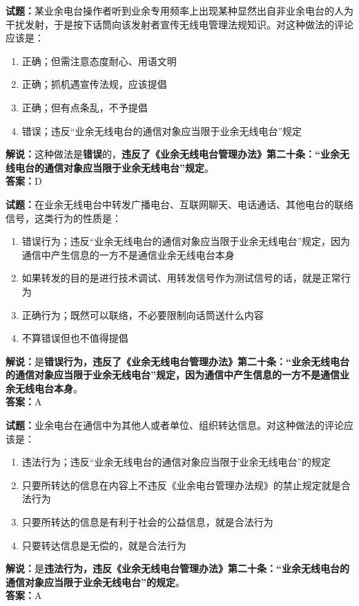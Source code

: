 \documentclass{ctexbook}
\begin{document}
\bigskip


\noindent\textbf{试题：}某业余电台操作者听到业余专用频率上出现某种显然出自非业余电台的人为干扰发射，于是按下话筒向该发射者宣传无线电管理法规知识。对这种做法的评论应该是：
\begin{enumerate}[leftmargin=3em]
\item 正确；但需注意态度耐心、用语文明
\item 正确；抓机遇宣传法规，应该提倡
\item 正确；但有点条乱，不予提倡
\item 错误；违反“业余无线电台的通信对象应当限于业余无线电台”规定%
\end{enumerate}
\noindent\textbf{解说：}这种做法是\textbf{错误}的，\textbf{违反了《业余无线电台管理办法》第二十条：“业余无线电台的通信对象应当限于业余无线电台”规定}。\\\noindent\textbf{答案：}D



\bigskip


\noindent\textbf{试题：}在业余无线电台中转发广播电台、互联网聊天、电话通话、其他电台的联络信号，这类行为的性质是：
\begin{enumerate}[leftmargin=3em]
\item 错误行为；违反“业余无线电台的通信对象应当限于业余无线电台”规定，因为通信中产生信息的一方不是通信业余无线电台本身
\item 如果转发的目的是进行技术调试、用转发信号作为测试信号的话，就是正常行为
\item 正确行为；既然可以联络，不必要限制向话筒送什么内容
\item 不算错误但也不值得提倡
\end{enumerate}
\noindent\textbf{解说：}是\textbf{错误行为，违反了《业余无线电台管理办法》第二十条：“业余无线电台的通信对象应当限于业余无线电台”规定，因为通信中产生信息的一方不是通信业余无线电台本身}。\\\noindent\textbf{答案：}A



\bigskip


\noindent\textbf{试题：}业余电台在通信中为其他人或者单位、组织转达信息。对这种做法的评论应该是：
\begin{enumerate}[leftmargin=3em]
\item 违法行为；违反“业余无线电台的通信对象应当限于业余无线电台”的规定
\item 只要所转达的信息在内容上不违反《业余电台管理办法规》的禁止规定就是合法行为
\item 只要所转达的信息是有利于社会的公益信息，就是合法行为
\item 只要转达信息是无偿的，就是合法行为
\end{enumerate}
\noindent\textbf{解说：}是\textbf{违法行为，违反《业余无线电台管理办法》第二十条：“业余无线电台的通信对象应当限于业余无线电台”的规定}。\\\noindent\textbf{答案：}A
\end{document}
